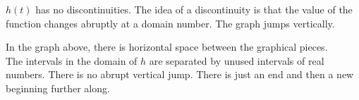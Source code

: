\documentclass{ximera}
\begin{document}
\begin{example}
$h(t)$ has no discontinuities.  The idea of a discontinuity is that the value of the function changes abruptly at a domain number.  The graph jumps vertically.  

In the graph above, there is horizontal space between the graphical pieces.  \\


The intervals in the domain of $h$ are separated by unused intervals of real numbers.  There is no abrupt vertical jump.  There is just an end and then a new beginning further along.

\end{example}
\end{document}
